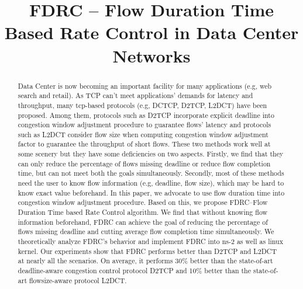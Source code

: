 \documentclass[10pt, conference, letterpaper]{IEEEtran}
\begin{document}
\title{ FDRC -- Flow Duration Time Based Rate Control in Data Center Networks }
\author{
}

\maketitle


\begin{abstract}

Data Center is now becoming an important facility for many applications (e.g, web search and retail).
As TCP can't meet applications' demands for latency and throughput, 
many tcp-based protocols (e.g, DCTCP, D2TCP, L2DCT) have been proposed.
Among them, protocols such as D2TCP incorporate explicit deadline into congestion window adjustment procedure to guarantee flows' latency and 
protocols such as L2DCT consider flow size when computing congestion window adjustment factor to guarantee the throughput of short flows. 
These two methods work well at some scenery but they have some deficiencies on two aspects.
Firstly, we find that they can only reduce the percentage of flows missing deadline or reduce flow completion time, 
but can not meet both the goals simultaneously.
Secondly, most of these methods need the user to know flow information (e.g, deadline, flow size),
which may be hard to know exact value beforehand. 
In this paper, we advocate to use flow duration time into congestion window adjustment procedure.
Based on this, we propose FDRC--Flow Duration Time based Rate Control algorithm.
We find that without knowing flow information beforehand,
FDRC can achieve the goal of reducing the percentage of flows missing deadline
and cutting average flow completion time simultaneously. 
We theoretically analyze FDRC's behavior and implement FDRC into ns-2 as well as linux kernel.  
Our experiments show that FDRC performs better than D2TCP and L2DCT at nearly all the scenarios. 
On average, it performs 30\% better than the state-of-art deadline-aware congestion control protocol D2TCP and 
10\% better than the state-of-art flowsize-aware protocol L2DCT.
\end{abstract}
\end{document}
